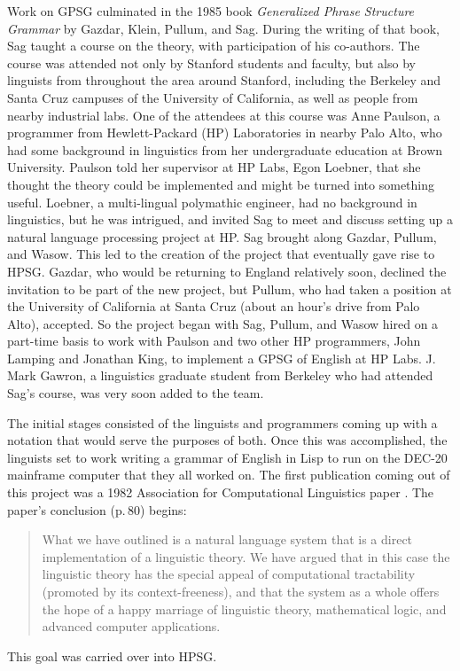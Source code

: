 \documentclass[output=paper]{langsci/langscibook}
\begin{document}
Work on GPSG culminated in the 1985 book \textit{Generalized Phrase Structure Grammar} by Gazdar,  Klein, Pullum, and Sag.  During the writing of that book, Sag taught a course on the theory, with participation of his co-authors.  The course was attended not only by Stanford students and faculty, but also by linguists from throughout the area around Stanford, including the Berkeley and Santa Cruz campuses of the University of California, as well as people from nearby industrial labs.  One of the attendees at this course was Anne Paulson, a programmer from Hewlett-Packard (HP) Laboratories in nearby Palo Alto, who had some background in linguistics from her undergraduate education at Brown University.  Paulson told her supervisor at HP Labs, Egon Loebner, that she thought the theory could be implemented and might be turned into something useful. Loebner, a multi-lingual polymathic engineer, had no background in linguistics, but he was intrigued, and invited Sag to meet and discuss setting up a natural language processing project at HP. Sag brought along Gazdar, Pullum, and Wasow. This led to the creation of the project that eventually gave rise to HPSG.  Gazdar, who would be returning to England relatively soon, declined the invitation to be part of the new project, but Pullum, who had taken a position at the University of California at Santa Cruz (about an hour's drive from Palo Alto), accepted.  So the project began with Sag, Pullum, and Wasow hired on a part-time basis to work with Paulson and two other HP programmers, John Lamping and Jonathan King, to implement a GPSG of English at HP Labs.  J. Mark Gawron, a linguistics graduate student from Berkeley who had attended Sag's course, was very soon added to the team.

The initial stages consisted of the linguists and programmers coming up with a notation that would serve the purposes of both.  Once this was accomplished, the linguists set to work writing a grammar of English in Lisp to run on the DEC-20 mainframe computer that they all worked on.   The first publication coming out of this project was a 1982 Association for Computational Linguistics paper \citep{Gaw:Kin:Lam:82}.  The paper's conclusion (p.\,80) begins:
\begin{quote}
What we have outlined is a natural language system that is a direct implementation of a linguistic
theory.  We have argued that in this case the linguistic theory has the special appeal of
computational tractability (promoted by its context-freeness), and that the system as a whole offers
the hope of a happy marriage of linguistic theory, mathematical logic, and advanced computer
applications. \citep[]{Gaw:Kin:Lam:82}
\end{quote}
This goal was carried over into HPSG.
\end{document}

